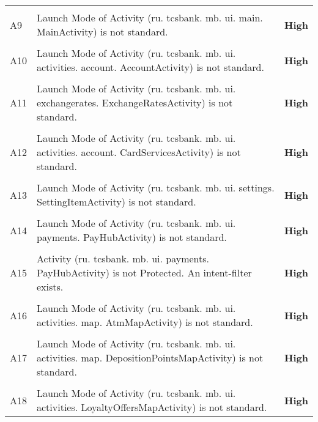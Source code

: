 \documentclass[12p]{article}
\begin{document}
\begin{longtable}{p{0.5cm} p{10cm} p{1.5cm}}
\hline\\	A9&Launch Mode of Activity \newline (ru. tcsbank. mb. ui. main. MainActivity) is not standard.& \color{ferrarired}\textbf{High} \\
\hline\\	A10&Launch Mode of Activity \newline (ru. tcsbank. mb. ui. activities. account. AccountActivity) is not standard.& \color{ferrarired}\textbf{High} \\
\hline\\	A11&Launch Mode of Activity \newline (ru. tcsbank. mb. ui. exchangerates. ExchangeRatesActivity) is not standard.& \color{ferrarired}\textbf{High} \\
\hline\\	A12&Launch Mode of Activity \newline (ru. tcsbank. mb. ui. activities. account. CardServicesActivity) is not standard.& \color{ferrarired}\textbf{High} \\
\hline\\	A13&Launch Mode of Activity \newline (ru. tcsbank. mb. ui. settings. SettingItemActivity) is not standard.& \color{ferrarired}\textbf{High} \\
\hline\\	A14&Launch Mode of Activity \newline (ru. tcsbank. mb. ui. payments. PayHubActivity) is not standard.& \color{ferrarired}\textbf{High} \\
\hline\\	A15&Activity \newline (ru. tcsbank. mb. ui. payments. PayHubActivity) is not Protected. An intent-filter exists.& \color{ferrarired}\textbf{High} \\
\hline\\	A16&Launch Mode of Activity \newline (ru. tcsbank. mb. ui. activities. map. AtmMapActivity) is not standard.& \color{ferrarired}\textbf{High} \\
\hline\\	A17&Launch Mode of Activity \newline (ru. tcsbank. mb. ui. activities. map. DepositionPointsMapActivity) is not standard.& \color{ferrarired}\textbf{High} \\
\hline\\	A18&Launch Mode of Activity \newline (ru. tcsbank. mb. ui. activities. LoyaltyOffersMapActivity) is not standard.& \color{ferrarired}\textbf{High} \\

\end{longtable}
\end{document}
